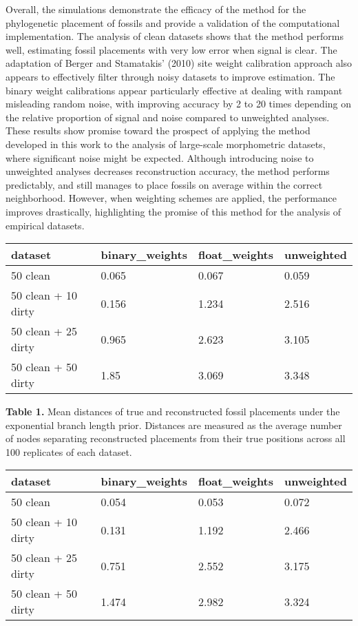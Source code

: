 \documentclass[12pt]{article}
\begin{document}
Overall, the simulations demonstrate the efficacy of the method for the
phylogenetic placement of fossils and provide a validation of the
computational implementation. The analysis of clean datasets shows that
the method performs well, estimating fossil placements with very low
error when signal is clear. The adaptation of Berger and Stamatakis'
(2010) site weight calibration approach also appears to effectively
filter through noisy datasets to improve estimation. The binary weight
calibrations appear particularly effective at dealing with rampant
misleading random noise, with improving accuracy by 2 to 20 times
depending on the relative proportion of signal and noise compared to
unweighted analyses. These results show promise toward the prospect of
applying the method developed in this work to the analysis of
large-scale morphometric datasets, where significant noise might be
expected. Although introducing noise to unweighted analyses decreases
reconstruction accuracy, the method performs predictably, and still
manages to place fossils on average within the correct neighborhood.
However, when weighting schemes are applied, the performance improves
drastically, highlighting the promise of this method for the analysis of
empirical datasets.

\begin{longtable}[]{@{}llll@{}}
\toprule
dataset & binary\_weights & float\_weights & unweighted\tabularnewline
\midrule
\endhead
50 clean & 0.065 & 0.067 & 0.059\tabularnewline
50 clean + 10 dirty & 0.156 & 1.234 & 2.516\tabularnewline
50 clean + 25 dirty & 0.965 & 2.623 & 3.105\tabularnewline
50 clean + 50 dirty & 1.85 & 3.069 & 3.348\tabularnewline
\bottomrule
\end{longtable}

\textbf{Table 1.} Mean distances of true and reconstructed fossil
placements under the exponential branch length prior. Distances are measured as the average number of nodes
separating reconstructed placements from their true positions across all
100 replicates of each dataset.

\begin{longtable}[]{@{}llll@{}}
\toprule
dataset & binary\_weights & float\_weights & unweighted\tabularnewline
\midrule
\endhead
50 clean & 0.054  & 0.053 & 0.072 \tabularnewline
50 clean + 10 dirty & 0.131 & 1.192 & 2.466 \tabularnewline
50 clean + 25 dirty & 0.751 & 2.552 & 3.175 \tabularnewline
50 clean + 50 dirty & 1.474 & 2.982  & 3.324\tabularnewline
\bottomrule
\end{longtable}
\end{document}
